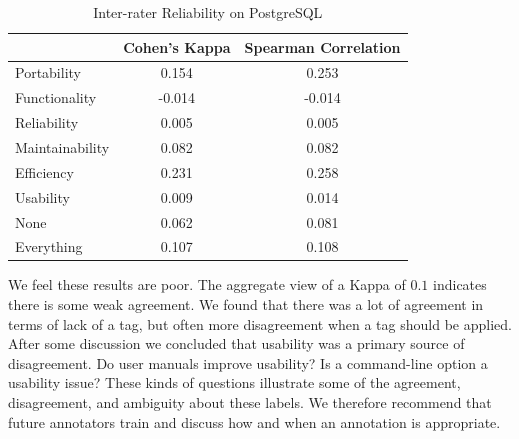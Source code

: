\documentclass[smallextended]{svjour3}       %
\begin{document}


\begin{table}
\centering
\begin{tabular}{l|c|c}
\hline
            & Cohen's Kappa & Spearman Correlation \\ \hline
Portability & 0.154 & 0.253  \\
Functionality & -0.014 & -0.014 \\
Reliability & 0.005 & 0.005 \\
Maintainability & 0.082 & 0.082 \\
Efficiency & 0.231 & 0.258 \\
Usability & 0.009 & 0.014 \\
None &      0.062 & 0.081 \\ \hline 
Everything & 0.107 & 0.108 \\ \hline
\end{tabular}
\caption{Inter-rater Reliability on PostgreSQL}
\label{tab:interr}
\end{table}

 

We feel these results are poor. The aggregate view of a Kappa of
$0.1$ indicates there is some weak agreement. We found that
there was a lot of agreement in terms of lack of a tag, but often more
disagreement when a tag should be applied. After some discussion we concluded that 
usability was a primary source of
disagreement. Do user manuals improve usability? Is a command-line
option a usability issue? These kinds of questions illustrate some of
the agreement, disagreement, and ambiguity about these labels. 
We therefore recommend that future annotators train and discuss how and when an annotation is appropriate.
\end{document}
